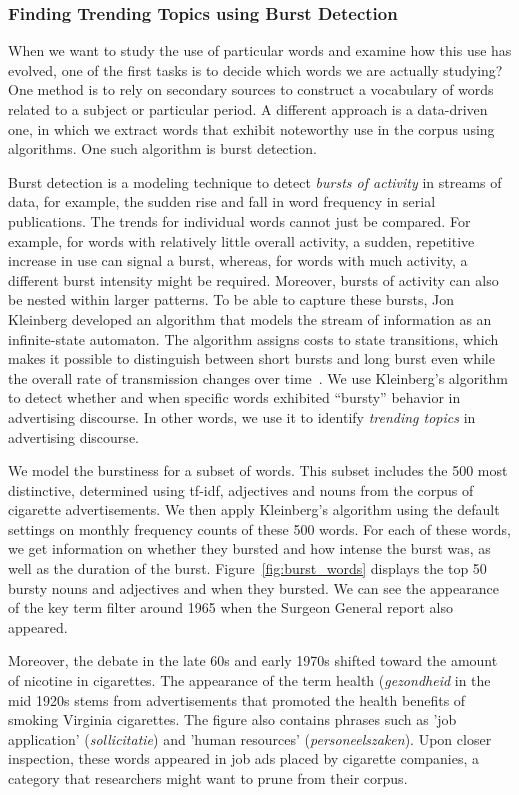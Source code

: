 \documentclass[USenglish]{article}
\begin{document}
\subsubsection{Finding Trending Topics using Burst Detection}
When we want to study the use of particular words and examine how this use has evolved, one of the first tasks is to decide which words we are actually studying? One method is to rely on secondary sources to construct a vocabulary of words related to a subject or particular period. A different approach is a data-driven one, in which we extract words that exhibit noteworthy use in the corpus using algorithms. One such algorithm is burst detection.

Burst detection is a modeling technique to detect \textit{bursts of activity} in streams of data, for example, the sudden rise and fall in word frequency in serial publications. The trends for individual words cannot just be compared. For example, for words with relatively little overall activity, a sudden, repetitive increase in use can signal a burst, whereas, for words with much activity, a different burst intensity might be required. Moreover, bursts of activity can also be nested within larger patterns. To be able to capture these bursts, Jon Kleinberg developed an algorithm that models the stream of information as an infinite-state automaton. The algorithm assigns costs to state transitions, which makes it possible to distinguish between short bursts and long burst even while the overall rate of transmission changes over time~\cite{kleinberg_bursty_2002}. We use Kleinberg's algorithm to detect whether and when specific words exhibited ``bursty'' behavior in advertising discourse. In other words, we use it to identify \textit{trending topics} in advertising discourse. 

We model the burstiness for a subset of words. This subset includes the 500 most distinctive, determined using tf-idf, adjectives and nouns from the corpus of cigarette advertisements. We then apply Kleinberg's algorithm using the default settings on monthly frequency counts of these 500 words. For each of these words, we get information on whether they bursted and how intense the burst was, as well as the duration of the burst. Figure~\ref{fig:burst_words} displays the top 50 bursty nouns and adjectives and when they bursted. We can  see the appearance of the key term filter around 1965 when the Surgeon General report also appeared. 

Moreover, the debate in the late 60s and early 1970s shifted toward the amount of nicotine in cigarettes. The appearance of the term health (\textit{gezondheid} in the mid 1920s stems from advertisements that promoted the health benefits of smoking Virginia cigarettes. The figure also contains phrases such as 'job application' (\textit{sollicitatie}) and 'human resources' (\textit{personeelszaken}). Upon closer inspection, these words appeared in job ads placed by cigarette companies, a category that researchers might want to prune from their corpus.
\end{document}
